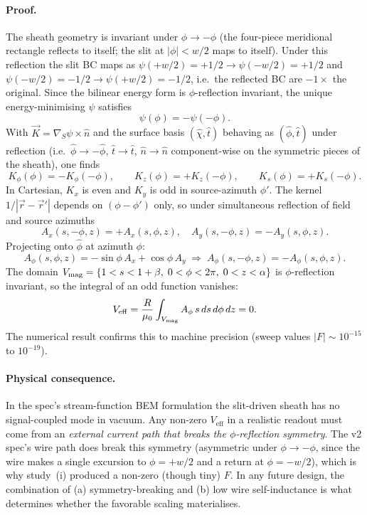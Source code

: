 \documentclass[11pt]{article}
\newcommand{\Veff}{V_{\mathrm{eff}}}
\begin{document}
\paragraph{Proof.}  The sheath geometry is invariant under
$\phi\to-\phi$ (the four-piece meridional rectangle reflects to
itself; the slit at $|\phi|<w/2$ maps to itself).  Under this
reflection the slit BC maps as
$\psi(+w/2)=+1/2\to\psi(-w/2)=+1/2$ and
$\psi(-w/2)=-1/2\to\psi(+w/2)=-1/2$, i.e.\ the reflected BC are
$-1\times$ the original.  Since the bilinear energy form is
$\phi$-reflection invariant, the unique energy-minimising
$\psi$ satisfies
\begin{equation}
\psi(\phi)=-\psi(-\phi).
\end{equation}
With $\vec K=\nabla_S\psi\times\hat n$ and the surface basis
$(\hat\chi,\hat t)$ behaving as $(\hat\phi,\hat t)$ under reflection
(i.e.\ $\hat\phi\to-\hat\phi$, $\hat t\to\hat t$, $\hat n\to\hat n$
component-wise on the symmetric pieces of the sheath), one finds
\begin{equation}
K_\phi(\phi)=-K_\phi(-\phi),\qquad
K_z(\phi)=+K_z(-\phi),\qquad
K_s(\phi)=+K_s(-\phi).
\end{equation}
In Cartesian, $K_x$ is even and $K_y$ is odd in source-azimuth
$\phi'$.  The kernel $1/|\vec r-\vec r'|$ depends on
$(\phi-\phi')$ only, so under simultaneous reflection of field and
source azimuths
\begin{equation}
A_x(s,-\phi,z)=+A_x(s,\phi,z),\quad
A_y(s,-\phi,z)=-A_y(s,\phi,z).
\end{equation}
Projecting onto $\hat\phi$ at azimuth $\phi$:
\begin{equation}
A_\phi(s,\phi,z)=-\sin\phi\,A_x+\cos\phi\,A_y
\;\Longrightarrow\;
A_\phi(s,-\phi,z)=-A_\phi(s,\phi,z).
\end{equation}
The domain $V_{\rm mag}=\{1<s<1+\beta,\;0<\phi<2\pi,\;0<z<\alpha\}$ is
$\phi$-reflection invariant, so the integral of an odd function
vanishes:
\begin{equation}
\Veff=\frac{R}{\mu_0}\int_{V_{\rm mag}} A_\phi\,s\,ds\,d\phi\,dz=0.
\end{equation}
The numerical result confirms this to machine precision (sweep
values $|F|\sim 10^{-15}$ to $10^{-19}$).

\paragraph{Physical consequence.}  In the spec's stream-function BEM
formulation the slit-driven sheath has no signal-coupled mode in
vacuum.  Any non-zero $\Veff$ in a realistic readout must come from
an \emph{external current path that breaks the $\phi$-reflection
symmetry}.  The v2 spec's wire path does break this symmetry (asymmetric
under $\phi\to-\phi$, since the wire makes a single excursion to
$\phi=+w/2$ and a return at $\phi=-w/2$), which is why study~(i)
produced a non-zero (though tiny) $F$.  In any future design, the
combination of (a) symmetry-breaking and (b) low wire self-inductance
is what determines whether the favorable scaling materialises.
\end{document}
